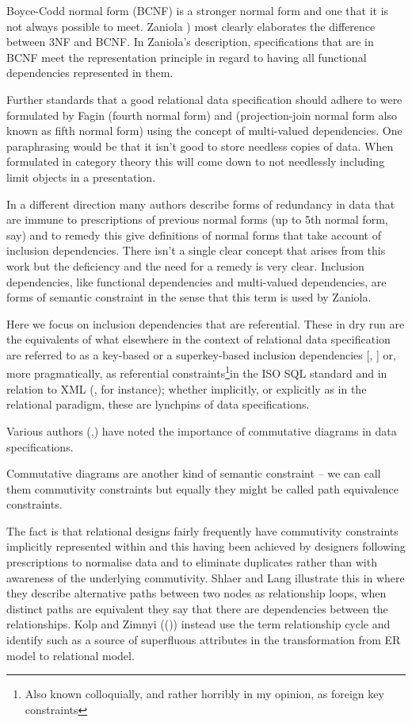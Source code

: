 \documentclass[10pt,a4paper]{article}
\theoremstyle{remark}
\begin{document}
\note Boyce-Codd normal form (BCNF) is a stronger normal form and one that it is not always possible to meet. Zaniola \cite{zaniolo1982}) most clearly elaborates the difference between 3NF and BCNF. 
In Zaniola's description, specifications that are in BCNF meet the representation principle in regard to having all functional dependencies represented in them.

\note Further standards that a good relational data specification should adhere to were formulated by Fagin \cite{Fagin1977} (fourth normal form) and  \cite{Fagin1979} (projection-join normal form also known as fifth normal form)
using the concept of multi-valued dependencies. 
One paraphrasing would be that it isn't good to store needless copies of data. 
When formulated in category theory this will come down to not needlessly including limit objects in a presentation.

\note In a different direction many authors describe forms of redundancy in data that are immune to prescriptions
of previous normal forms (up to 5th normal form, say) and to remedy this give definitions of normal forms that
take account of inclusion dependencies.
There isn't a single clear concept that arises from this work but the deficiency and the need for a remedy is very clear.  
Inclusion dependencies, like functional dependencies and multi-valued dependencies, are forms of semantic constraint in the sense that this term is used by Zaniola. 

\note Here we focus on inclusion dependencies that are referential. These in dry run are the equivalents of what elsewhere in the context of relational data specification are referred to as a key-based or a superkey-based inclusion dependencies [\cite{Mannila1986}, \cite{Levene2000}]
or, more pragmatically, as referential constraints\footnote{	Also known colloquially, and rather horribly in my opinion, as foreign key constraints}in the ISO SQL standard\cite{ISOSQL2016} and in relation to XML
(\cite{fan2003}, for instance); whether implicitly, or explicitly as in the relational paradigm, these are lynchpins of  data specifications.

\note Various authors (\cite{Alderson97},\cite{Johnson93}) have noted the importance of commutative diagrams in data specifications.
\begin{newtt}Commutative diagrams are another kind of semantic constraint -- we can call them commutivity constraints but equally they might be called path equivalence constraints.\end{newtt}  The fact is that relational designs fairly frequently have commutivity constraints implicitly represented within  and this having been achieved  by designers following prescriptions to normalise data and to eliminate duplicates rather than with awareness of the underlying commutivity. 
Shlaer and Lang illustrate this in \cite{Shlaer96} where they describe alternative paths between two nodes as
relationship loops, when distinct paths are equivalent they say that there are dependencies
between the relationships. Kolp and Zimnyi ((\cite{Kolp1995})) instead use the term
relationship cycle and identify such as a source of superfluous attributes in the
transformation from ER model to relational model.
\end{document}
